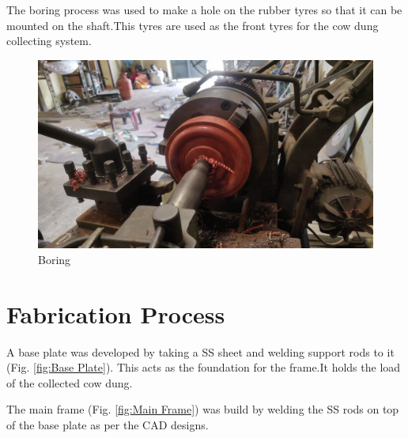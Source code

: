 The boring process was used to make a hole on the rubber tyres so that it can be mounted on the shaft.This tyres are used as the front tyres for the cow dung collecting system.

\begin{figure}[h!]
    \centering
    \includegraphics[scale=0.15]{Boring.jpg}
    \caption{Boring}
    \label{fig:Boring}
\end{figure}

\section{Fabrication Process} \label{Fabrication Process}

A base plate was developed by taking a SS sheet and welding support rods to it (Fig. \ref{fig:Base Plate}). This acts as the foundation for the frame.It holds the load of the collected cow dung.

The main frame (Fig. \ref{fig:Main Frame}) was build by welding the SS rods on top of the base plate  as per the CAD designs.

